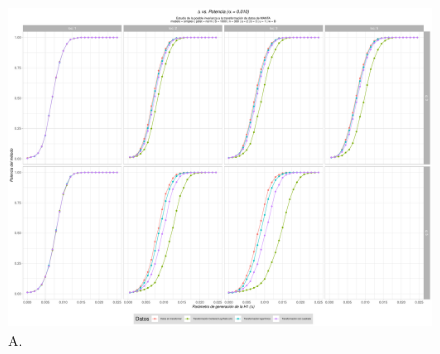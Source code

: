 \documentclass[IB,BIB]{TFUOC}%
\begin{document}
\begin{figure}[!htbp]
\hspace*{-0.8cm} %
    \centering
    \includegraphics[scale=.45]{OBJ2SimplexMANTAqloc001.pdf}
    \caption{\scriptsize{A.}}
    \label{figAppend:OBJ2SimplexMANTAqloc001}
\end{figure}
\end{document}
